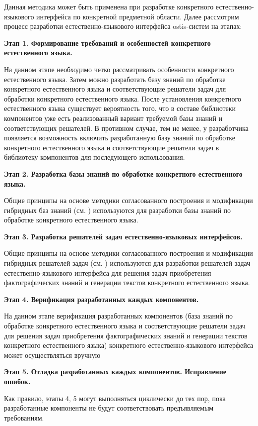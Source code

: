 Данная методика может быть применена при разработке конкретного естественно-языкового интерфейса по конкретной предметной области. Далее рассмотрим процесс разработки естественно-языкового интерфейса ostis-систем на этапах:

\textbf{Этап 1. Формирование требований и особенностей конкретного естественного языка.}

На данном этапе необходимо четко рассматривать особенности конкретного естественного языка. Затем можно разработать базу знаний по обработке конкретного естественного языка и соответствующие решатели задач для обработки конкретного естественного языка. После установления конкретного естественного языка существует вероятность того, что в составе библиотеки компонентов уже есть реализованный вариант требуемой базы знаний и соответствующих решателей. В противном случае, тем не менее, у разработчика появляется возможность включить разработанную базу знаний по обработке конкретного естественного языка и соответствующие решатели задач в библиотеку компонентов для последующего использования.

\textbf{Этап 2. Разработка базы знаний по обработке конкретного естественного языка.}

Общие принципы на основе методики согласованного построения и модификации гибридных баз знаний (см. ) используются для разработки базы знаний по обработке конкретного естественного языка.

\textbf{Этап 3. Разработка решателей задач естественно-языковых интерфейсов.}

Общие принципы на основе методики согласованного построения и модификации гибридных решателей задач (см. ) используются для разработки решателей задач естественно-языкового интерфейса для решения задач приобретения фактографических знаний и генерации текстов конкретного естественного языка.

\textbf{Этап 4. Верификация разработанных каждых компонентов.}

На данном этапе верификация разработанных компонентов (база знаний по обработке конкретного естественного языка и соответствующие решатели задач для решения задач приобретения фактографических знаний и генерации текстов конкретного естественного языка) конкретного естественно-языкового интерфейса может осуществляться вручную

\textbf{Этап 5. Отладка разработанных каждых компонентов. Исправление ошибок.}

Как правило, этапы 4, 5 могут выполняться циклически до тех пор, пока разработанные компоненты не будут соответствовать предъявляемым требованиям.

